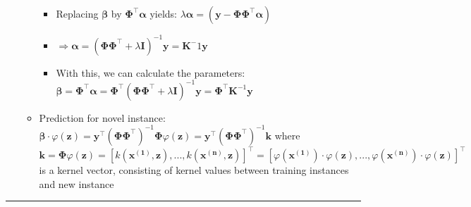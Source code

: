 \begin{itemize}
\begin{itemize}
\begin{itemize}
            \item Replacing $\boldsymbol{\beta}$ by $\boldsymbol{\Phi}^\intercal \boldsymbol{\alpha}$ yields: $\lambda \boldsymbol{\alpha} = (\boldsymbol{y} - \boldsymbol{\Phi} \boldsymbol{\Phi}^\intercal \boldsymbol{\alpha})$
            \item $\Rightarrow \boldsymbol{\alpha} = (\boldsymbol{\Phi} \boldsymbol{\Phi}^\intercal + \lambda \boldsymbol{I})^{-1} \boldsymbol{y} = \boldsymbol{K}^-1 \boldsymbol{y}$
            \item With this, we can calculate the parameters: $\boldsymbol{\beta} = \boldsymbol{\Phi}^\intercal \boldsymbol{\alpha} = \boldsymbol{\Phi}^\intercal (\boldsymbol{\Phi} \boldsymbol{\Phi}^\intercal + \lambda \boldsymbol{I})^{-1} \boldsymbol{y} = \boldsymbol{\Phi}^\intercal \boldsymbol{K}^{-1} \boldsymbol{y}$
        \end{itemize}
        \item Prediction for novel instance: $\boldsymbol{\beta} \cdot \varphi({\boldsymbol{z}}) = \boldsymbol{y}^\intercal (\boldsymbol{\Phi} \boldsymbol{\Phi}^\intercal)^{-1}  \boldsymbol{\Phi} \varphi({\boldsymbol{z}}) = \boldsymbol{y}^\intercal (\boldsymbol{\Phi} \boldsymbol{\Phi}^\intercal)^{-1} \boldsymbol{k}$ where $\boldsymbol{k} = \boldsymbol{\Phi} \varphi({\boldsymbol{z}}) = [ k(\boldsymbol{x^{(1)}}, \boldsymbol{z}), ..., k(\boldsymbol{x^{(n)}}, \boldsymbol{z}) ]^\intercal = [ \varphi(\boldsymbol{x^{(1)}}) \cdot \varphi(\boldsymbol{z}), ..., \varphi(\boldsymbol{x^{(n)}}) \cdot \varphi(\boldsymbol{z}) ]^\intercal$ is a kernel vector, consisting of kernel values between training instances and new instance
    \end{itemize}
\end{itemize}

{\color{lightgray}\hrule height 0.001mm}


